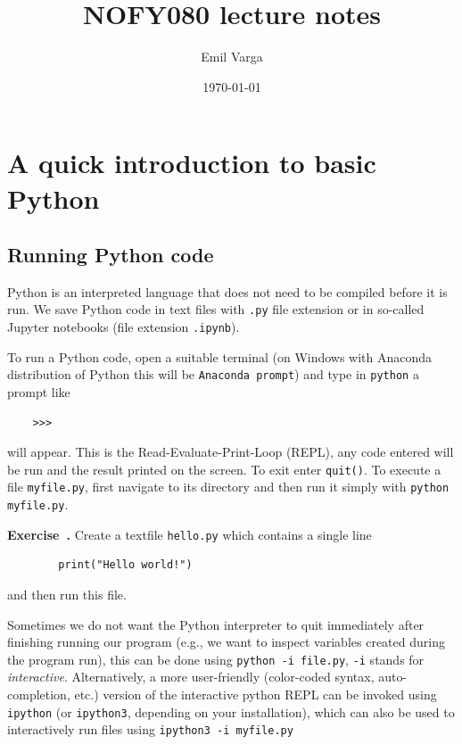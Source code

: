 \documentclass{article}
\title{NOFY080 lecture notes}
\author{Emil Varga}
\date{\today}
\newcounter{exercise}
\newenvironment{exercise}[1][]%
    {\refstepcounter{exercise}%
    \begin{mdframed}[backgroundcolor=exercise,linecolor=white]%
    \textbf{Exercise~\theexercise.} #1 \rmfamily}%
    {\medskip\end{mdframed}}
\newcounter{syntax}
\begin{document}
\maketitle

\tableofcontents
\listofintermezzos
\lstlistoflistings

\newpage
\section{A quick introduction to basic Python}

\subsection{Running Python code}
Python is an interpreted language that does not need to be compiled before it is run. We save Python code in text files with \verb|.py| file extension or in so-called Jupyter notebooks (file extension \verb|.ipynb|).

To run a Python code, open a suitable terminal (on Windows with Anaconda distribution of Python this will be \verb|Anaconda prompt|) and type in \verb|python| a prompt like
\begin{lstlisting}
    >>>
\end{lstlisting}
will appear. This is the Read-Evaluate-Print-Loop (REPL), any code entered will be run and the result printed on the screen. To exit enter \verb|quit()|. To execute a file \verb|myfile.py|, first navigate to its directory and then run it simply with \verb|python myfile.py|.

\begin{exercise}
    Create a textfile \verb|hello.py| which contains a single line
    \begin{lstlisting}
        print("Hello world!")
    \end{lstlisting}
    and then run this file.
\end{exercise}

Sometimes we do not want the Python interpreter to quit immediately after finishing running our program (e.g., we want to inspect variables created during the program run), this can be done using \verb|python -i file.py|, \verb|-i| stands for \emph{interactive}. Alternatively, a more user-friendly (color-coded syntax, auto-completion, etc.) version of the interactive python REPL can be invoked using \verb|ipython| (or \verb|ipython3|, depending on your installation), which can also be used to interactively run files using \verb|ipython3 -i myfile.py|
\end{document}
